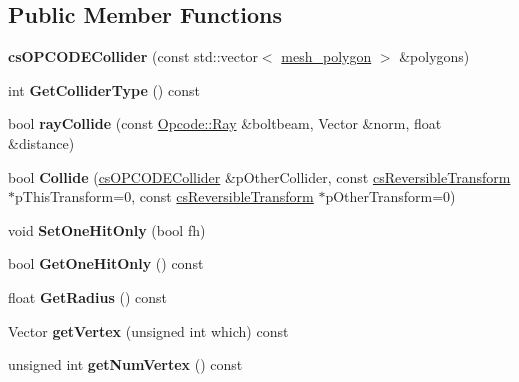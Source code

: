 \subsection*{Public Member Functions}
\begin{DoxyCompactItemize}
\item 
{\bfseries cs\+O\+P\+C\+O\+D\+E\+Collider} (const std\+::vector$<$ \hyperlink{structmesh__polygon}{mesh\+\_\+polygon} $>$ \&polygons)\hypertarget{classcsOPCODECollider_a63c5a546f8e7ed4b1f9eabf97494cefc}{}\label{classcsOPCODECollider_a63c5a546f8e7ed4b1f9eabf97494cefc}

\item 
int {\bfseries Get\+Collider\+Type} () const \hypertarget{classcsOPCODECollider_a3045f0d0f715db5c21a02a67329ec9a5}{}\label{classcsOPCODECollider_a3045f0d0f715db5c21a02a67329ec9a5}

\item 
bool {\bfseries ray\+Collide} (const \hyperlink{classOpcode_1_1Ray}{Opcode\+::\+Ray} \&boltbeam, Vector \&norm, float \&distance)\hypertarget{classcsOPCODECollider_ad95e4cb6a70eaf8b8b1179fd4a0c1385}{}\label{classcsOPCODECollider_ad95e4cb6a70eaf8b8b1179fd4a0c1385}

\item 
bool {\bfseries Collide} (\hyperlink{classcsOPCODECollider}{cs\+O\+P\+C\+O\+D\+E\+Collider} \&p\+Other\+Collider, const \hyperlink{classcsReversibleTransform}{cs\+Reversible\+Transform} $\ast$p\+This\+Transform=0, const \hyperlink{classcsReversibleTransform}{cs\+Reversible\+Transform} $\ast$p\+Other\+Transform=0)\hypertarget{classcsOPCODECollider_ab295d71cd436ef322062a5f2bf455a2b}{}\label{classcsOPCODECollider_ab295d71cd436ef322062a5f2bf455a2b}

\item 
void {\bfseries Set\+One\+Hit\+Only} (bool fh)\hypertarget{classcsOPCODECollider_acf5c3709fa89ffa08b979f26398419b8}{}\label{classcsOPCODECollider_acf5c3709fa89ffa08b979f26398419b8}

\item 
bool {\bfseries Get\+One\+Hit\+Only} () const \hypertarget{classcsOPCODECollider_a0822b34c63d6e85c7a2e11ab3e9a9299}{}\label{classcsOPCODECollider_a0822b34c63d6e85c7a2e11ab3e9a9299}

\item 
float {\bfseries Get\+Radius} () const \hypertarget{classcsOPCODECollider_a2175fb62e2291f7b7f0802e8484abf84}{}\label{classcsOPCODECollider_a2175fb62e2291f7b7f0802e8484abf84}

\item 
Vector {\bfseries get\+Vertex} (unsigned int which) const \hypertarget{classcsOPCODECollider_a646b8b87cc296f790cb7bb91c117189a}{}\label{classcsOPCODECollider_a646b8b87cc296f790cb7bb91c117189a}

\item 
unsigned int {\bfseries get\+Num\+Vertex} () const \hypertarget{classcsOPCODECollider_a3e635c61cd40245eb779cb81b5b658c6}{}\label{classcsOPCODECollider_a3e635c61cd40245eb779cb81b5b658c6}

\end{DoxyCompactItemize}
